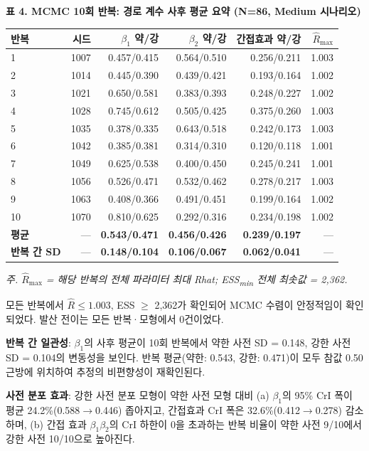 \documentclass[a4paper,10pt]{oblivoir}
\begin{document}
\textbf{표 4. MCMC 10회 반복: 경로 계수 사후 평균 요약 (N=86, Medium 시나리오)}

\begin{table}[htbp]
\centering
\small
\begin{tabular}{lrrrrr}
\toprule
반복 & 시드 & $\beta_1$ 약/강 & $\beta_2$ 약/강 & 간접효과 약/강 & $\hat{R}_{\max}$ \\
\midrule
 1 & 1007 & 0.457/0.415 & 0.564/0.510 & 0.256/0.211 & 1.003 \\
 2 & 1014 & 0.445/0.390 & 0.439/0.421 & 0.193/0.164 & 1.002 \\
 3 & 1021 & 0.650/0.581 & 0.383/0.393 & 0.248/0.227 & 1.002 \\
 4 & 1028 & 0.745/0.612 & 0.505/0.425 & 0.375/0.260 & 1.003 \\
 5 & 1035 & 0.378/0.335 & 0.643/0.518 & 0.242/0.173 & 1.003 \\
 6 & 1042 & 0.385/0.381 & 0.314/0.310 & 0.120/0.118 & 1.001 \\
 7 & 1049 & 0.625/0.538 & 0.400/0.450 & 0.245/0.241 & 1.001 \\
 8 & 1056 & 0.526/0.471 & 0.532/0.462 & 0.278/0.217 & 1.003 \\
 9 & 1063 & 0.408/0.366 & 0.491/0.451 & 0.199/0.164 & 1.002 \\
10 & 1070 & 0.810/0.625 & 0.292/0.316 & 0.234/0.198 & 1.002 \\
\midrule
\textbf{평균} & --- & \textbf{0.543/0.471} & \textbf{0.456/0.426} & \textbf{0.239/0.197} & --- \\
\textbf{반복 간 SD} & --- & \textbf{0.148/0.104} & \textbf{0.106/0.067} & \textbf{0.062/0.041} & --- \\
\bottomrule
\end{tabular}
\end{table}

\textit{주. $\hat{R}_{\max}$ = 해당 반복의 전체 파라미터 최대 Rhat; ESS\textsubscript{min} 전체 최솟값 = 2,362.}

모든 반복에서 $\hat{R} \leq 1.003$, ESS \ensuremath{\geq} 2,362가 확인되어 MCMC 수렴이 안정적임이 확인되었다. 발산 전이는 모든 반복·모형에서 0건이었다.

\textbf{반복 간 일관성}: $\beta_1$의 사후 평균이 10회 반복에서 약한 사전 SD = 0.148, 강한 사전 SD = 0.104의 변동성을 보인다. 반복 평균(약한: 0.543, 강한: 0.471)이 모두 참값 0.50 근방에 위치하여 추정의 비편향성이 재확인된다.

\textbf{사전 분포 효과}: 강한 사전 분포 모형이 약한 사전 모형 대비 (a) $\beta_1$의 95\% CrI 폭이 평균 24.2\%(0.588\ensuremath{\rightarrow}0.446) 좁아지고, 간접효과 CrI 폭은 32.6\%(0.412\ensuremath{\rightarrow}0.278) 감소하며, (b) 간접 효과 $\beta_1\beta_2$의 CrI 하한이 0을 초과하는 반복 비율이 약한 사전 9/10에서 강한 사전 10/10으로 높아진다.
\end{document}
